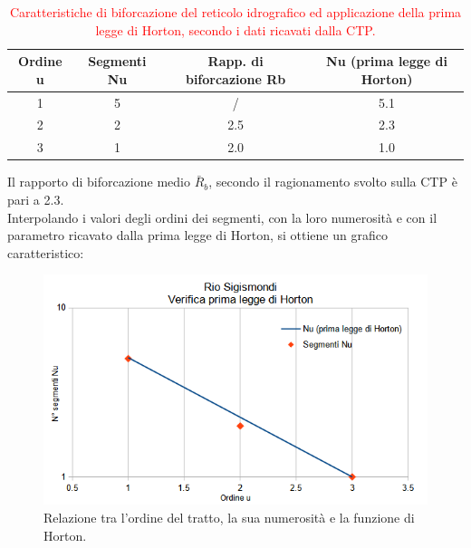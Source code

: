 \begin{table}[H] \centering
    \caption{\textcolor{red}{Caratteristiche di biforcazione del reticolo idrografico ed applicazione della prima legge di Horton, secondo i dati ricavati dalla CTP.}}
    \label{tab:rapp_biforcazione_1_horton}
    \begin{tabular}{ cccc }
\toprule
    Ordine u & Segmenti Nu & Rapp. di biforcazione Rb & Nu (prima legge di Horton) \\
\midrule    
    1        & 5           &   /                     & 5.1                        \\
    2        & 2           & 2.5                      & 2.3                        \\
    3        & 1           & 2.0                      & 1.0                       \\
\bottomrule    
\end{tabular}
\end{table}
Il rapporto di biforcazione medio $\bar{R}_b$, secondo il ragionamento svolto sulla CTP è pari a \num{2.3}.\\
Interpolando i valori degli ordini dei segmenti, con la loro numerosità e con il parametro ricavato dalla prima legge di Horton, si ottiene un grafico caratteristico:
\begin{figure}[H]\centering
    \includegraphics[scale=.75]{immagini/legge_horton.png}
    \caption{Relazione tra l'ordine del tratto, la sua numerosità e la funzione di Horton.}
    \label{legge_horton}
\end{figure}

